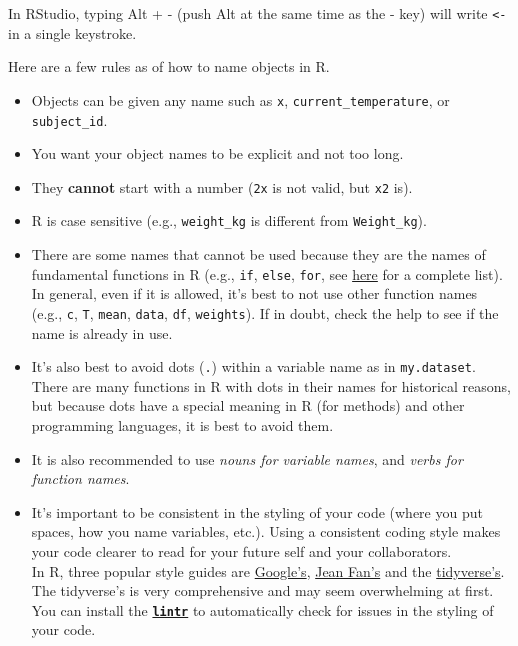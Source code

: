 \documentclass[]{book}
\providecommand{\tightlist}{%
  \setlength{\itemsep}{0pt}\setlength{\parskip}{0pt}}
\theoremstyle{definition}
\theoremstyle{definition}
\theoremstyle{definition}
\theoremstyle{remark}
\begin{document}
In RStudio, typing Alt + - (push Alt at the same time as the - key) will
write \texttt{\textless{}-} in a single keystroke.

Here are a few rules as of how to name objects in R.

\begin{itemize}
\tightlist
\item
  Objects can be given any name such as \texttt{x},
  \texttt{current\_temperature}, or \texttt{subject\_id}.
\item
  You want your object names to be explicit and not too long.
\item
  They \textbf{cannot} start with a number (\texttt{2x} is not valid,
  but \texttt{x2} is).
\item
  R is case sensitive (e.g., \texttt{weight\_kg} is different from
  \texttt{Weight\_kg}).
\item
  There are some names that cannot be used because they are the names of
  fundamental functions in R (e.g., \texttt{if}, \texttt{else},
  \texttt{for}, see
  \href{https://stat.ethz.ch/R-manual/R-devel/library/base/html/Reserved.html}{here}
  for a complete list). In general, even if it is allowed, it's best to
  not use other function names (e.g., \texttt{c}, \texttt{T},
  \texttt{mean}, \texttt{data}, \texttt{df}, \texttt{weights}). If in
  doubt, check the help to see if the name is already in use.
\item
  It's also best to avoid dots (\texttt{.}) within a variable name as in
  \texttt{my.dataset}. There are many functions in R with dots in their
  names for historical reasons, but because dots have a special meaning
  in R (for methods) and other programming languages, it is best to
  avoid them.
\item
  It is also recommended to use \emph{nouns for variable names}, and
  \emph{verbs for function names}.
\item
  It's important to be consistent in the styling of your code (where you
  put spaces, how you name variables, etc.). Using a consistent coding
  style makes your code clearer to read for your future self and your
  collaborators.\\
  In R, three popular style guides are
  \href{https://google.github.io/styleguide/Rguide.xml}{Google's},
  \href{http://jef.works/R-style-guide/}{Jean Fan's} and the
  \href{http://style.tidyverse.org/}{tidyverse's}. The tidyverse's is
  very comprehensive and may seem overwhelming at first. You can install
  the \href{https://github.com/jimhester/lintr}{\textbf{\texttt{lintr}}}
  to automatically check for issues in the styling of your code.
\end{itemize}
\end{document}
